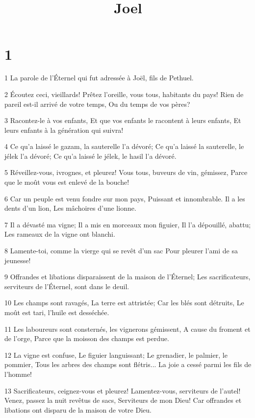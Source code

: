 

\title{Joel}


\chapter{1}

\par 1 La parole de l'Éternel qui fut adressée à Joël, fils de Pethuel.
\par 2 Écoutez ceci, vieillards! Prêtez l'oreille, vous tous, habitants du pays! Rien de pareil est-il arrivé de votre temps, Ou du temps de vos pères?
\par 3 Racontez-le à vos enfants, Et que vos enfants le racontent à leurs enfants, Et leurs enfants à la génération qui suivra!
\par 4 Ce qu'a laissé le gazam, la sauterelle l'a dévoré; Ce qu'a laissé la sauterelle, le jélek l'a dévoré; Ce qu'a laissé le jélek, le hasil l'a dévoré.
\par 5 Réveillez-vous, ivrognes, et pleurez! Vous tous, buveurs de vin, gémissez, Parce que le moût vous est enlevé de la bouche!
\par 6 Car un peuple est venu fondre sur mon pays, Puissant et innombrable. Il a les dents d'un lion, Les mâchoires d'une lionne.
\par 7 Il a dévasté ma vigne; Il a mis en morceaux mon figuier, Il l'a dépouillé, abattu; Les rameaux de la vigne ont blanchi.
\par 8 Lamente-toi, comme la vierge qui se revêt d'un sac Pour pleurer l'ami de sa jeunesse!
\par 9 Offrandes et libations disparaissent de la maison de l'Éternel; Les sacrificateurs, serviteurs de l'Éternel, sont dans le deuil.
\par 10 Les champs sont ravagés, La terre est attristée; Car les blés sont détruits, Le moût est tari, l'huile est desséchée.
\par 11 Les laboureurs sont consternés, les vignerons gémissent, A cause du froment et de l'orge, Parce que la moisson des champs est perdue.
\par 12 La vigne est confuse, Le figuier languissant; Le grenadier, le palmier, le pommier, Tous les arbres des champs sont flétris... La joie a cessé parmi les fils de l'homme!
\par 13 Sacrificateurs, ceignez-vous et pleurez! Lamentez-vous, serviteurs de l'autel! Venez, passez la nuit revêtus de sacs, Serviteurs de mon Dieu! Car offrandes et libations ont disparu de la maison de votre Dieu.
